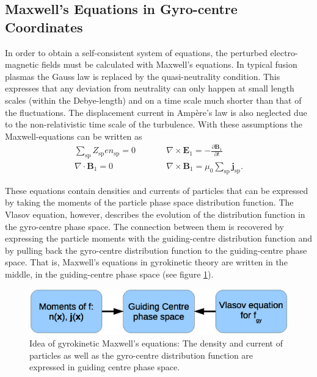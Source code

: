 \documentclass[a4paper,10pt]{article}
\newcommand{\st}[1]{\mathrm{#1}} %
\begin{document}
\subsection{Maxwell's Equations in Gyro-centre Coordinates} \label{sec:gk_maxwell}
In order to obtain a self-consistent system of equations, the perturbed electro-magnetic fields must be calculated with Maxwell's equations. In typical fusion plasmas the Gauss law is replaced by the quasi-neutrality condition. This expresses that any deviation from neutrality can only happen at small length scales (within the Debye-length) and on a time scale much shorter than that of the fluctuations. The displacement current in Amp\`ere's law is also neglected due to the non-relativistic time scale of the turbulence. With these assumptions the Maxwell-equations can be written as
\begin{eqnarray*}
	\sum_{\st{sp}} Z_{\st{sp}} e n_{\st{sp}} = 0 &\qquad& \nabla \times \mathbf{E}_1 = - \frac{\partial \mathbf{B}_1}{\partial t} \\
	\nabla \cdot \mathbf{B}_1 = 0 &\qquad& \nabla \times \mathbf{B}_1 = \mu_0 \sum_{\st{sp}} \mathbf{j}_{\st{sp}}.
\end{eqnarray*}

These equations contain densities and currents of particles that can be expressed by taking the moments of the particle phase space distribution function. The Vlasov equation, however, describes the evolution of the distribution function in the gyro-centre phase space. The connection between them is recovered by expressing the particle moments with the guiding-centre distribution function and by pulling back the gyro-centre distribution function to the guiding-centre phase space. That is, Maxwell's equations in gyrokinetic theory are written in the middle, in the guiding-centre phase space (see figure \ref{fig:maxwell-transform}). 

\begin{figure}
 \begin{center}
	\includegraphics[scale=0.5]{maxwell-transform.eps}
 \end{center}
 \caption{Idea of gyrokinetic Maxwell's equations: The density and current of particles as well as the gyro-centre distribution function are expressed in guiding centre phase space.}
 \label{fig:maxwell-transform}
\end{figure}
\end{document}
